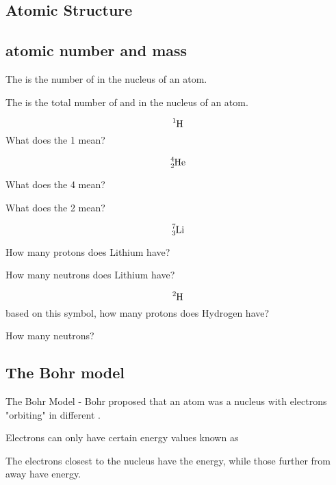 \documentclass[12pt]{exam}
\begin{document}
    
\begin{questions}
        
\section{Atomic Structure}

\subsection{atomic number and mass}

\question The  is the number of \fillin[protons][3cm] in the nucleus of an atom.

\question The  is the total number of \fillin[protons][2cm] and \fillin[neutrons][2cm]in the nucleus of an atom.



\question $$\ce{^{1}_{}H}$$
What does the 1 mean?

\fillwithlines{2cm}


\question $$\ce{^{4}_{2}He}$$

\question What does the 4 mean? 

\fillwithlines{1cm}

\question What does the 2 mean?
\fillwithlines{1cm}

\question $$\ce{^{7}_{3}Li}$$

How many protons does Lithium have? \fillin[3][2cm]

How many neutrons does Lithium have? \fillin[4][2cm]

\question $$\ce{^{2}_{}H}$$ based on this symbol, how many protons does Hydrogen have? \fillin[1][1cm]

How many neutrons? \fillin[1][1cm]

\vspace{3cm}

\subsection{The Bohr model}

\question   The Bohr Model - Bohr proposed that an atom was a nucleus with electrons "orbiting" in different .

\question Electrons can only have certain energy values known as 

\question The electrons closest to the nucleus have the \fillin[lowest] energy, while those further from away have \fillin[higher] energy.


\end{questions}
\end{document}
